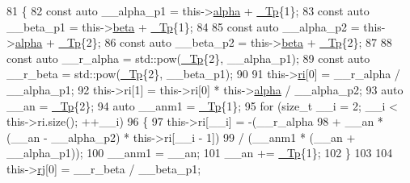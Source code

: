 \begin{DoxyCode}
81     \{
82       \textcolor{keyword}{const} \textcolor{keyword}{auto} \_\_alpha\_p1 = this->\hyperlink{struct____gnu__cxx_1_1qaws__integration__table_a22b7131c633fe090ec1055d51b486bc0}{alpha} + \hyperlink{namespace____gnu__cxx_a3b19a9c800ca194374ef9172290f7d79}{\_Tp}\{1\};
83       \textcolor{keyword}{const} \textcolor{keyword}{auto} \_\_beta\_p1 = this->\hyperlink{struct____gnu__cxx_1_1qaws__integration__table_ad7cdd51af800d8830907d0718035753c}{beta} + \hyperlink{namespace____gnu__cxx_a3b19a9c800ca194374ef9172290f7d79}{\_Tp}\{1\};
84 
85       \textcolor{keyword}{const} \textcolor{keyword}{auto} \_\_alpha\_p2 = this->\hyperlink{struct____gnu__cxx_1_1qaws__integration__table_a22b7131c633fe090ec1055d51b486bc0}{alpha} + \hyperlink{namespace____gnu__cxx_a3b19a9c800ca194374ef9172290f7d79}{\_Tp}\{2\};
86       \textcolor{keyword}{const} \textcolor{keyword}{auto} \_\_beta\_p2 = this->\hyperlink{struct____gnu__cxx_1_1qaws__integration__table_ad7cdd51af800d8830907d0718035753c}{beta} + \hyperlink{namespace____gnu__cxx_a3b19a9c800ca194374ef9172290f7d79}{\_Tp}\{2\};
87 
88       \textcolor{keyword}{const} \textcolor{keyword}{auto} \_\_r\_alpha = std::pow(\hyperlink{namespace____gnu__cxx_a3b19a9c800ca194374ef9172290f7d79}{\_Tp}\{2\}, \_\_alpha\_p1);
89       \textcolor{keyword}{const} \textcolor{keyword}{auto} \_\_r\_beta = std::pow(\hyperlink{namespace____gnu__cxx_a3b19a9c800ca194374ef9172290f7d79}{\_Tp}\{2\}, \_\_beta\_p1);
90 
91       this->\hyperlink{struct____gnu__cxx_1_1qaws__integration__table_aa38340ca8677164ecd511a35d5d2a8e7}{ri}[0] = \_\_r\_alpha / \_\_alpha\_p1;
92       this->ri[1] = this->ri[0] * this->\hyperlink{struct____gnu__cxx_1_1qaws__integration__table_a22b7131c633fe090ec1055d51b486bc0}{alpha} / \_\_alpha\_p2;
93       \textcolor{keyword}{auto} \_\_an = \hyperlink{namespace____gnu__cxx_a3b19a9c800ca194374ef9172290f7d79}{\_Tp}\{2\};
94       \textcolor{keyword}{auto} \_\_anm1 = \hyperlink{namespace____gnu__cxx_a3b19a9c800ca194374ef9172290f7d79}{\_Tp}\{1\};
95       \textcolor{keywordflow}{for} (\textcolor{keywordtype}{size\_t} \_\_i = 2; \_\_i < this->ri.size(); ++\_\_i)
96         \{
97           this->ri[\_\_i] = -(\_\_r\_alpha
98                           + \_\_an * (\_\_an - \_\_alpha\_p2) * this->ri[\_\_i - 1])
99                         / (\_\_anm1 * (\_\_an + \_\_alpha\_p1));
100           \_\_anm1 = \_\_an;
101           \_\_an += \hyperlink{namespace____gnu__cxx_a3b19a9c800ca194374ef9172290f7d79}{\_Tp}\{1\};
102         \}
103 
104       this->\hyperlink{struct____gnu__cxx_1_1qaws__integration__table_a1b6aa4c79cb8c470510cabc5a502327c}{rj}[0] = \_\_r\_beta / \_\_beta\_p1;

\end{DoxyCode}
